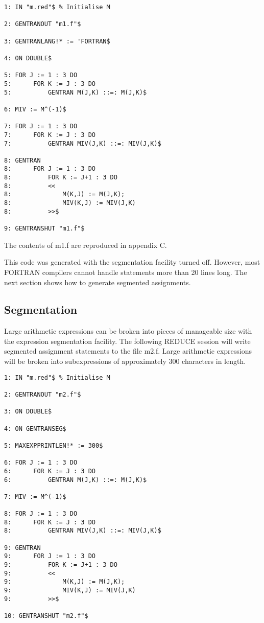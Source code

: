 \begin{verbatim}
1: IN "m.red"$ % Initialise M

2: GENTRANOUT "m1.f"$ 

3: GENTRANLANG!* := 'FORTRAN$

4: ON DOUBLE$

5: FOR J := 1 : 3 DO 
5:      FOR K := J : 3 DO 
5:          GENTRAN M(J,K) ::=: M(J,K)$

6: MIV := M^(-1)$ 

7: FOR J := 1 : 3 DO 
7:      FOR K := J : 3 DO 
7:          GENTRAN MIV(J,K) ::=: MIV(J,K)$

8: GENTRAN 
8:      FOR J := 1 : 3 DO 
8:          FOR K := J+1 : 3 DO 
8:          << 
8:              M(K,J) := M(J,K); 
8:              MIV(K,J) := MIV(J,K) 
8:          >>$ 

9: GENTRANSHUT "m1.f"$
\end{verbatim}
The contents of m1.f are reproduced in appendix C.

This code was generated with the segmentation facility turned off.  However,
most FORTRAN compilers cannot handle statements more than 20 lines
long.  The next section shows how to generate segmented assignments.

\subsection{Segmentation}
\label{seg:example}
Large arithmetic expressions can be broken into pieces of manageable
size with the expression segmentation facility.  The following REDUCE
session will write segmented assignment statements to the
file m2.f.  Large arithmetic expressions will be broken into
subexpressions of approximately 300 characters in length.

\begin{verbatim}
1: IN "m.red"$ % Initialise M

2: GENTRANOUT "m2.f"$ 

3: ON DOUBLE$

4: ON GENTRANSEG$ 

5: MAXEXPPRINTLEN!* := 300$ 

6: FOR J := 1 : 3 DO 
6:      FOR K := J : 3 DO 
6:          GENTRAN M(J,K) ::=: M(J,K)$ 

7: MIV := M^(-1)$ 

8: FOR J := 1 : 3 DO 
8:      FOR K := J : 3 DO 
8:          GENTRAN MIV(J,K) ::=: MIV(J,K)$ 

9: GENTRAN 
9:      FOR J := 1 : 3 DO 
9:          FOR K := J+1 : 3 DO 
9:          << 
9:              M(K,J) := M(J,K); 
9:              MIV(K,J) := MIV(J,K) 
9:          >>$ 

10: GENTRANSHUT "m2.f"$ 
\end{verbatim}

